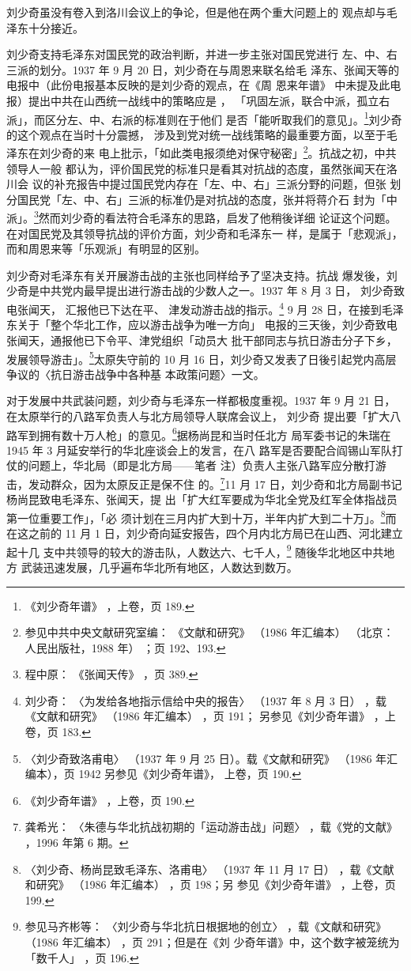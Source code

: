 刘少奇虽没有卷入到洛川会议上的争论，但是他在两个重大问题上的
观点却与毛泽东十分接近。

刘少奇支持毛泽东对国民党的政治判断，并进一步主张对国民党进行
左、中、右三派的划分。1937 年 9 月 20 日，刘少奇在与周恩来联名给毛
泽东、张闻天等的电报中（此份电报基本反映的是刘少奇的观点，在《周
恩来年谱》
中未提及此电报）提出中共在山西统一战线中的策略应是 ，
「巩固左派，联合中派，孤立右派」，而区分左、中、右派的标准则在于他们
是否「能听取我们的意见」。\footnote{《刘少奇年谱》
，上卷，页 189.}刘少奇的这个观点在当时十分震撼，
涉及到党对统一战线策略的最重要方面，以至于毛泽东在刘少奇的来
电上批示，「如此类电报须绝对保守秘密」\footnote{参见中共中央文献研究室编：
《文献和研究》
（1986 年汇编本）
（北京：人民出版社，1988 年）
；页 192、193.}。抗战之初，中共领导人一般
都认为，评价国民党的标准只是看其对抗战的态度，虽然张闻天在洛川会
议的补充报告中提过国民党内存在「左、中、右」三派分野的问题，但张
划分国民党「左、中、右」三派的标准仍是对抗战的态度，张并将蒋介石
封为「中派」。\footnote{程中原：
《张闻天传》
，页 389.}然而刘少奇的看法符合毛泽东的思路，启发了他稍後详细
论证这个问题。在对国民党及其领导抗战的评价方面，刘少奇和毛泽东一
样，是属于「悲观派」，而和周恩来等「乐观派」有明显的区别。

刘少奇对毛泽东有关开展游击战的主张也同样给予了坚决支持。抗战
爆发後，刘少奇是中共党内最早提出进行游击战的少数人之一。1937 年 8
月 3 日，
刘少奇致电张闻天，
汇报他已下达在平、
津发动游击战的指示。\footnote{刘少奇：
〈为发给各地指示信给中央的报告〉
（1937 年 8 月 3 日）
，载《文献和研究》
（1986 年汇编本）
，页 191；
另参见《刘少奇年谱》
，上卷，页 183.} 9
月 28 日，在接到毛泽东关于「整个华北工作，应以游击战争为唯一方向」
电报的三天後，刘少奇致电张闻天，通报他已下令平、津党组织「动员大
批干部同志与抗日游击分子下乡，发展领导游击」。\footnote{〈刘少奇致洛甫电〉
（1937 年 9 月 25 日）。载《文献和研究》
（1986 年汇编本），页 1942 另参见《刘少奇年谱》，
上卷，页 190.}太原失守前的 10 月
16 日，刘少奇又发表了日後引起党内高层争议的〈抗日游击战争中各种基
本政策问题〉一文。

对于发展中共武装问题，刘少奇与毛泽东一样都极度重视。1937 年 9
月 21 日，
在太原举行的八路军负责人与北方局领导人联席会议上，
刘少奇
提出要「扩大八路军到拥有数十万人枪」的意见。\footnote{《刘少奇年谱》
，上卷，页 190.}据杨尚昆和当时任北方
局军委书记的朱瑞在 1945 年 3 月延安举行的华北座谈会上的发言，在八
路军是否要配合阎锡山军队打仗的问题上，华北局（即是北方局——笔者
注）负责人主张八路军应分散打游击，发动群众，因为太原反正是保不住
的。\footnote{龚希光：
〈朱德与华北抗战初期的「运动游击战」问题〉
，载《党的文献》
，1996 年第 6 期。}11 月 17 日，刘少奇和北方局副书记杨尚昆致电毛泽东、张闻天，提
出「扩大红军要成为华北全党及红军全体指战员第一位重要工作」，「必
须计划在三月内扩大到十万，半年内扩大到二十万」。\footnote{〈刘少奇、杨尚昆致毛泽东、洛甫电〉
（1937 年 11 月 17 日）
，载《文献和研究》
（1986 年汇编本）
，页 198；另
参见《刘少奇年谱》
，上卷，页 199.}而在这之前的 11
月 1 日，刘少奇向延安报告，四个月内北方局已在山西、河北建立起十几
支中共领导的较大的游击队，人数达六、七千人，\footnote{参见马齐彬等：
〈刘少奇与华北抗日根据地的创立〉
，载《文献和研究》
（1986 年汇编本）
，页 291；但是在《刘
少奇年谱》中，这个数字被笼统为「数千人」
，页 196.} 随後华北地区中共地方
武装迅速发展，几乎遍布华北所有地区，人数达到数万。

